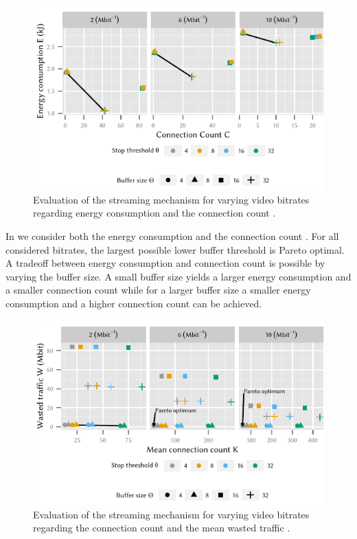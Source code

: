 \begin{figure}
  \centering
  \includegraphics{application/lte_video/trade_offs/figures/energy2connections}
  \caption{Evaluation of the streaming mechanism for varying video bitrates regarding energy consumption \energyconsumption and the connection count \connectioncount.}
  \label{fig:application:lte_video:numerical_evaluation:trade_offs:energy2connections}
\end{figure}

In  we consider both the energy consumption \energyconsumption and the connection count \connectioncount.
For all considered bitrates, the largest possible lower buffer threshold is Pareto optimal.
A tradeoff between energy consumption \energyconsumption and connection count \connectioncount is possible by varying the buffer size.
A small buffer size yields a larger energy consumption \energyconsumption and a smaller connection count \connectioncount while for a larger buffer size a smaller energy consumption \energyconsumption and a higher connection count \connectioncount can be achieved.

\begin{figure}
  \centering
  \includegraphics{application/lte_video/trade_offs/figures/connections2lostData}
  \caption{Evaluation of the streaming mechanism for varying video bitrates regarding the connection count \connectioncount and the mean wasted traffic \meanwastedtraffic.}
  \label{fig:application:lte_video:numerical_evaluation:trade_offs:connections2lostData}
\end{figure}

